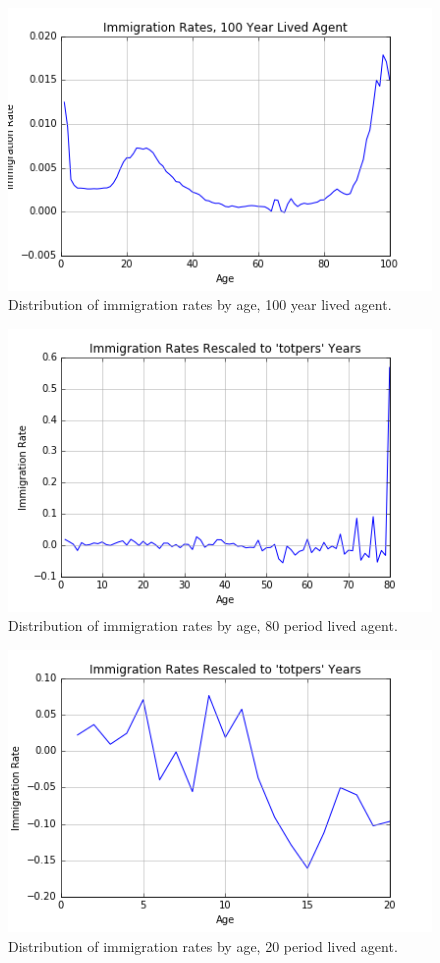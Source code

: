 \documentclass[letterpaper,12pt]{article}
\theoremstyle{definition}
\begin{document}
\begin{figure}[h!]
\centering
\includegraphics[scale=.8]{code/images/imm_totpers100}
\caption{Distribution of immigration rates by age, 100 year lived agent.}
\end{figure}

\begin{figure}[h!]
\centering
\includegraphics[scale=.8]{code/images/imm_totpers80}
\caption{Distribution of immigration rates by age, 80 period lived agent.}
\end{figure}

\begin{figure}[h!]
\centering
\includegraphics[scale=.8]{code/images/imm_totpers20}
\caption{Distribution of immigration rates by age, 20 period lived agent.}
\end{figure}
\end{document}
